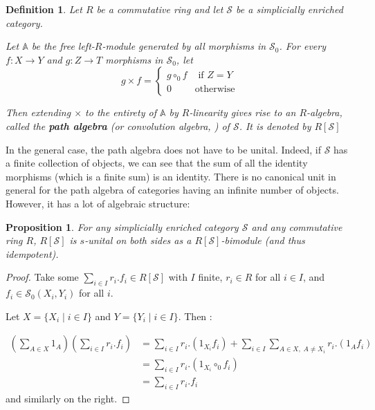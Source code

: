 \documentclass[a4paper,fleqn]{cas-sc}
\newtheorem{prop}[thm]{Proposition}%
\newtheorem{dfnt}{Definition}%
\newcommand{\bA}{\mathbb{A}}
\newcommand{\cS}{{\mathcal{S}}}
\begin{document}
    
\begin{dfnt}
Let $R$ be a commutative ring and let $\cS$ be a simplicially enriched category.

    Let $\bA$ be the free left-$R$-module generated by all morphisms in $\cS_0$. For every $f : X \to Y$ and $g : Z \to T$ morphisms in $\cS_0$, let 
    \[g \times f = \left\{
    \begin{array}{ll}
        g \circ_0 f & \mbox{ if } Z = Y \\
        0 & \mbox{otherwise}
    \end{array}
\right.\]

Then extending $\times$ to the entirety of $\bA$ by $R$-linearity gives rise to an $R$-algebra, called the \textbf{path algebra} (or convolution algebra, \cite{assocalg}) of $\cS$. It is denoted by $R[\cS]$
\end{dfnt}

In the general case, the path algebra does not have to be unital. Indeed, if $\cS$ has a finite collection of objects, we can see that the sum of all the identity morphisms (which is a finite sum) is an identity. There is no canonical unit in general for the path algebra of categories having an infinite number of objects. %
However, it has a lot of algebraic structure:

\begin{prop}
\label{prop:12}
For any simplicially enriched category $\cS$ and any commutative ring $R$, $R[\cS]$ is $s$-unital on both sides as a $R[\cS]$-bimodule (and thus idempotent).
\end{prop}

\begin{proof}
Take some $\sum_{i \in I} r_i . f_i \in R[\cS]$ with $I$ finite, $r_i \in R$ for all $i \in I$, and $f_i \in \cS_0(X_i, Y_i)$ for all $i$.

Let $X = \{X_i \; | \; i \in I \}$ 
and
$Y = \{Y_i \; | \; i \in I \}$. 
Then :

\begin{align*}
    \left(\sum_{A \in X} 1_A\right) \left(\sum_{i \in I} r_i. f_i\right) 
    &= \sum_{i \in I} r_i. (1_{X_i} f_i) + \sum_{i \in I} \sum_{A \in X, \; A \neq X_i} r_i.(1_A f_i)\\
    &= \sum_{i \in I} r_i. (1_{X_i} \circ_0 f_i) \\
    &= \sum_{i \in I} r_i.  f_i
\end{align*}
and similarly on the right.
\end{proof}
\end{document}
